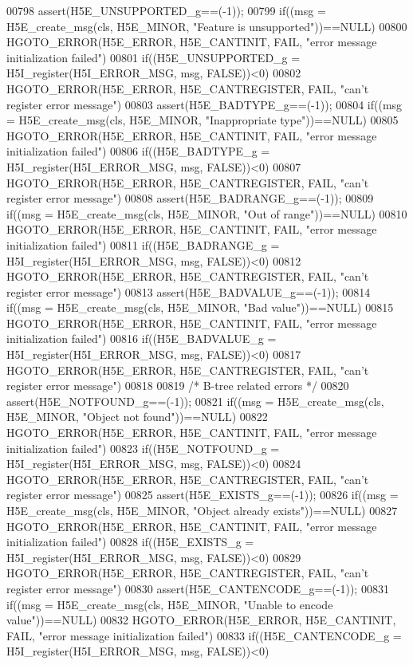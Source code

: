 \begin{DoxyCode}
00798 assert(H5E\_UNSUPPORTED\_g==(-1));
00799 if((msg = H5E\_create\_msg(cls, H5E\_MINOR, "Feature is unsupported"))==NULL)
00800     HGOTO\_ERROR(H5E\_ERROR, H5E\_CANTINIT, FAIL, "error message initialization failed")
00801 if((H5E\_UNSUPPORTED\_g = H5I\_register(H5I\_ERROR\_MSG, msg, FALSE))<0)
00802     HGOTO\_ERROR(H5E\_ERROR, H5E\_CANTREGISTER, FAIL, "can't register error message")
00803 assert(H5E\_BADTYPE\_g==(-1));
00804 if((msg = H5E\_create\_msg(cls, H5E\_MINOR, "Inappropriate type"))==NULL)
00805     HGOTO\_ERROR(H5E\_ERROR, H5E\_CANTINIT, FAIL, "error message initialization failed")
00806 if((H5E\_BADTYPE\_g = H5I\_register(H5I\_ERROR\_MSG, msg, FALSE))<0)
00807     HGOTO\_ERROR(H5E\_ERROR, H5E\_CANTREGISTER, FAIL, "can't register error message")
00808 assert(H5E\_BADRANGE\_g==(-1));
00809 if((msg = H5E\_create\_msg(cls, H5E\_MINOR, "Out of range"))==NULL)
00810     HGOTO\_ERROR(H5E\_ERROR, H5E\_CANTINIT, FAIL, "error message initialization failed")
00811 if((H5E\_BADRANGE\_g = H5I\_register(H5I\_ERROR\_MSG, msg, FALSE))<0)
00812     HGOTO\_ERROR(H5E\_ERROR, H5E\_CANTREGISTER, FAIL, "can't register error message")
00813 assert(H5E\_BADVALUE\_g==(-1));
00814 if((msg = H5E\_create\_msg(cls, H5E\_MINOR, "Bad value"))==NULL)
00815     HGOTO\_ERROR(H5E\_ERROR, H5E\_CANTINIT, FAIL, "error message initialization failed")
00816 if((H5E\_BADVALUE\_g = H5I\_register(H5I\_ERROR\_MSG, msg, FALSE))<0)
00817     HGOTO\_ERROR(H5E\_ERROR, H5E\_CANTREGISTER, FAIL, "can't register error message")
00818 
00819 \textcolor{comment}{/* B-tree related errors */}
00820 assert(H5E\_NOTFOUND\_g==(-1));
00821 if((msg = H5E\_create\_msg(cls, H5E\_MINOR, "Object not found"))==NULL)
00822     HGOTO\_ERROR(H5E\_ERROR, H5E\_CANTINIT, FAIL, "error message initialization failed")
00823 if((H5E\_NOTFOUND\_g = H5I\_register(H5I\_ERROR\_MSG, msg, FALSE))<0)
00824     HGOTO\_ERROR(H5E\_ERROR, H5E\_CANTREGISTER, FAIL, "can't register error message")
00825 assert(H5E\_EXISTS\_g==(-1));
00826 if((msg = H5E\_create\_msg(cls, H5E\_MINOR, "Object already exists"))==NULL)
00827     HGOTO\_ERROR(H5E\_ERROR, H5E\_CANTINIT, FAIL, "error message initialization failed")
00828 if((H5E\_EXISTS\_g = H5I\_register(H5I\_ERROR\_MSG, msg, FALSE))<0)
00829     HGOTO\_ERROR(H5E\_ERROR, H5E\_CANTREGISTER, FAIL, "can't register error message")
00830 assert(H5E\_CANTENCODE\_g==(-1));
00831 if((msg = H5E\_create\_msg(cls, H5E\_MINOR, "Unable to encode value"))==NULL)
00832     HGOTO\_ERROR(H5E\_ERROR, H5E\_CANTINIT, FAIL, "error message initialization failed")
00833 if((H5E\_CANTENCODE\_g = H5I\_register(H5I\_ERROR\_MSG, msg, FALSE))<0)

\end{DoxyCode}
